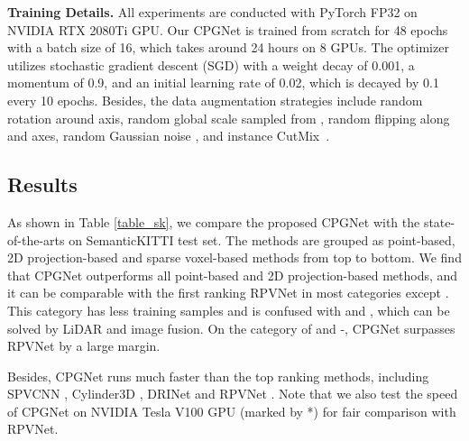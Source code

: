 \documentclass[letterpaper, 10 pt, conference]{ieeeconf}
\begin{document}
{\bf Training Details.}
All experiments are conducted with PyTorch FP32 on NVIDIA RTX 2080Ti GPU. Our CPGNet is trained from scratch for 48 epochs with a batch size of 16, which takes around 24 hours on 8 GPUs. The optimizer utilizes stochastic gradient descent (SGD) with a weight decay of 0.001, a momentum of 0.9, and an initial learning rate of 0.02, which is decayed by 0.1 every 10 epochs. Besides, the data augmentation strategies include random rotation around  axis, random global scale sampled from , random flipping along  and  axes, random Gaussian noise , and instance CutMix~\cite{xu2021rpvnet}.

\subsection{Results}
As shown in Table \ref{table_sk}, we compare the proposed CPGNet with the state-of-the-arts on SemanticKITTI test set. The methods are grouped as point-based, 2D projection-based and sparse voxel-based methods from top to bottom. We find that CPGNet outperforms all point-based and 2D projection-based methods, and it can be comparable with the first ranking RPVNet \cite{xu2021rpvnet} in most categories except . This category has less training samples and is confused with  and , which can be solved by LiDAR and image fusion. On the category of  and -, CPGNet surpasses RPVNet by a large margin.

Besides, CPGNet runs much faster than the top ranking methods, including SPVCNN \cite{tang2020searching}, Cylinder3D \cite{zhu2021cylindrical}, DRINet \cite{ye2021drinet} and RPVNet \cite{xu2021rpvnet}. Note that we also test the speed of CPGNet on NVIDIA Tesla V100 GPU (marked by *) for fair comparison with RPVNet.
\end{document}
